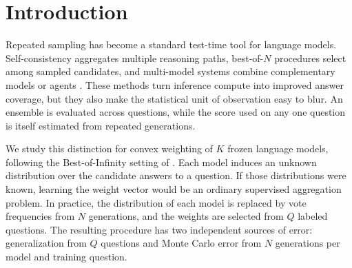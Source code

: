 \begin{abstract}
Weighted aggregation of frozen large language models is often analyzed as if
each model's answer distribution were known.  A deployed ensemble instead sees
empirical answer frequencies from finitely many generations.  This creates two
independent sample sizes: \(Q\) labeled questions used to learn the ensemble
weights and \(N\) generations used to estimate each model's answer distribution
on each labeled training question.  Raw empirical risk minimization can exploit
sign errors near ties.  We study a margin-buffered estimator that counts a
training question as solved only when the empirical gold-answer margin exceeds
its finite-generation uncertainty radius.  Under a one-sided margin condition
at the best fixed weight, the clean population excess risk of the learned
weights is the sum of a standard
\(Q^{-1/2}\) generalization term and an
\(N^{-\beta/2}\) boundary-resolution term, up to logarithmic factors.  A
hard-margin two-point construction shows that a margin condition alone cannot
improve the \(Q\)-rate.  Faster \(Q\)-rates become available only after adding
identifiable risk growth and an absolute margin condition.  We give a direct
MILP implementation, preserve reproducible finite-generation diagnostics from
the earlier system, and state separately the benchmark experiment still needed
to evaluate the calibrated buffer itself.
\end{abstract}

\section{Introduction}
\label{sec:intro}

Repeated sampling has become a standard test-time tool for language models.
Self-consistency aggregates multiple reasoning paths, best-of-\(N\) procedures
select among sampled candidates, and multi-model systems combine complementary
models or agents \citep{wang2022selfconsistencyic,brown2024largelm,
jiang2023llmblenderel,wang2024mixtureofagentsel}.  These methods turn inference
compute into improved answer coverage, but they also make the statistical unit
of observation easy to blur.  An ensemble is evaluated across questions, while
the score used on any one question is itself estimated from repeated
generations.

We study this distinction for convex weighting of \(K\) frozen language
models, following the Best-of-Infinity setting of
\citet{komiyama2026best}.  Each model induces an unknown distribution over the
candidate answers to a question.  If those distributions were known, learning
the weight vector would be an ordinary supervised aggregation problem.  In
practice, the distribution of each model is replaced by vote frequencies from
\(N\) generations, and the weights are selected from \(Q\) labeled questions.
The resulting procedure has two independent sources of error: generalization
from \(Q\) questions and Monte Carlo error from \(N\) generations per model and
training question.

